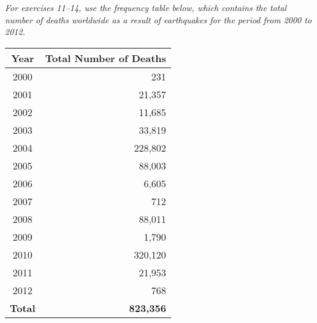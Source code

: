\begin{exercises}
\textit{For exercises 11--14, use the frequency table below, which contains the total number of deaths worldwide as a result of earthquakes for the period from 2000 to 2012.}\\
\begin{center}
\begin{tabular}{c | r}
\textbf{Year} & \textbf{Total Number of Deaths}\\
\hline
2000 & 231\\
2001 & 21,357\\
2002 & 11,685\\
2003 & 33,819\\
2004 & 228,802\\
2005 & 88,003\\
2006 & 6,605\\
2007 & 712\\
2008 & 88,011\\
2009 & 1,790\\
2010 & 320,120\\
2011 & 21,953\\
2012 & 768\\
\textbf{Total} & \textbf{823,356}
\end{tabular}
\end{center}






\end{exercises}
